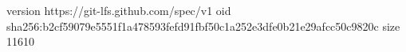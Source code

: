 version https://git-lfs.github.com/spec/v1
oid sha256:b2cf59079e5551f1a478593fefd91fbf50c1a252e3dfe0b21e29afcc50c9820c
size 11610
